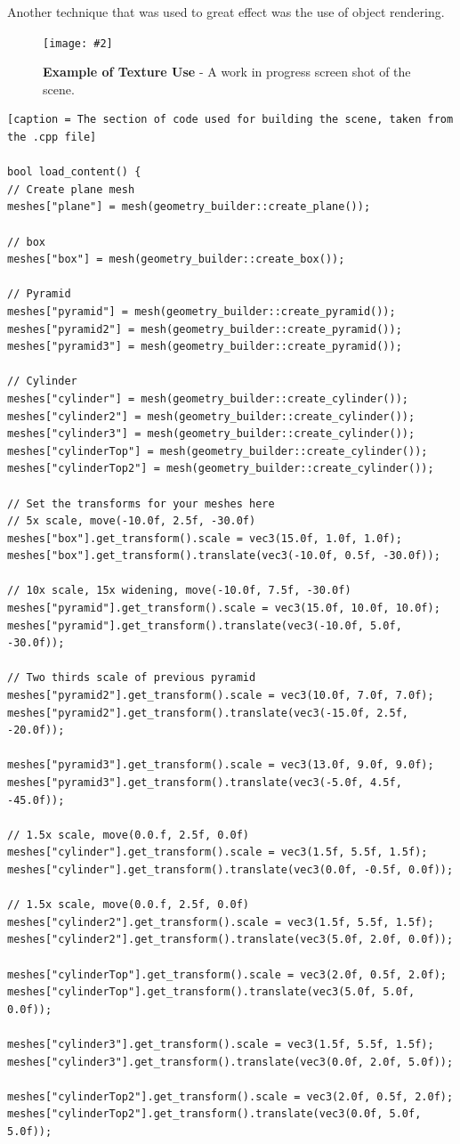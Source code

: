 \documentclass[10pt, a4paper]{article}
\newcommand{\figuremacro}[5]{
    \begin{figure}[#1]
        \centering
        \texttt{[image: \#2]}
        \caption[#3]{\textbf{#3}#4}
        \label{fig:#2}
    \end{figure}
}
\begin{document}
    Another technique that was used to great effect was the use of object rendering.  
    
    
    \figuremacro{h}{pyramids}{Example of Texture Use}{ - A work in progress screen shot of the scene.}{1.0}
	
\begin{lstlisting}[caption = The section of code used for building the scene, taken from the .cpp file]

bool load_content() {
// Create plane mesh
meshes["plane"] = mesh(geometry_builder::create_plane());

// box
meshes["box"] = mesh(geometry_builder::create_box());

// Pyramid
meshes["pyramid"] = mesh(geometry_builder::create_pyramid());
meshes["pyramid2"] = mesh(geometry_builder::create_pyramid());
meshes["pyramid3"] = mesh(geometry_builder::create_pyramid());

// Cylinder
meshes["cylinder"] = mesh(geometry_builder::create_cylinder());
meshes["cylinder2"] = mesh(geometry_builder::create_cylinder());
meshes["cylinder3"] = mesh(geometry_builder::create_cylinder());
meshes["cylinderTop"] = mesh(geometry_builder::create_cylinder());
meshes["cylinderTop2"] = mesh(geometry_builder::create_cylinder());

// Set the transforms for your meshes here
// 5x scale, move(-10.0f, 2.5f, -30.0f)
meshes["box"].get_transform().scale = vec3(15.0f, 1.0f, 1.0f);
meshes["box"].get_transform().translate(vec3(-10.0f, 0.5f, -30.0f));

// 10x scale, 15x widening, move(-10.0f, 7.5f, -30.0f)
meshes["pyramid"].get_transform().scale = vec3(15.0f, 10.0f, 10.0f);
meshes["pyramid"].get_transform().translate(vec3(-10.0f, 5.0f, -30.0f));

// Two thirds scale of previous pyramid
meshes["pyramid2"].get_transform().scale = vec3(10.0f, 7.0f, 7.0f);
meshes["pyramid2"].get_transform().translate(vec3(-15.0f, 2.5f, -20.0f));

meshes["pyramid3"].get_transform().scale = vec3(13.0f, 9.0f, 9.0f);
meshes["pyramid3"].get_transform().translate(vec3(-5.0f, 4.5f, -45.0f));

// 1.5x scale, move(0.0.f, 2.5f, 0.0f)
meshes["cylinder"].get_transform().scale = vec3(1.5f, 5.5f, 1.5f);
meshes["cylinder"].get_transform().translate(vec3(0.0f, -0.5f, 0.0f));

// 1.5x scale, move(0.0.f, 2.5f, 0.0f)
meshes["cylinder2"].get_transform().scale = vec3(1.5f, 5.5f, 1.5f);
meshes["cylinder2"].get_transform().translate(vec3(5.0f, 2.0f, 0.0f));

meshes["cylinderTop"].get_transform().scale = vec3(2.0f, 0.5f, 2.0f);
meshes["cylinderTop"].get_transform().translate(vec3(5.0f, 5.0f, 0.0f));

meshes["cylinder3"].get_transform().scale = vec3(1.5f, 5.5f, 1.5f);
meshes["cylinder3"].get_transform().translate(vec3(0.0f, 2.0f, 5.0f));

meshes["cylinderTop2"].get_transform().scale = vec3(2.0f, 0.5f, 2.0f);
meshes["cylinderTop2"].get_transform().translate(vec3(0.0f, 5.0f, 5.0f));

\end{lstlisting}
\end{document}
